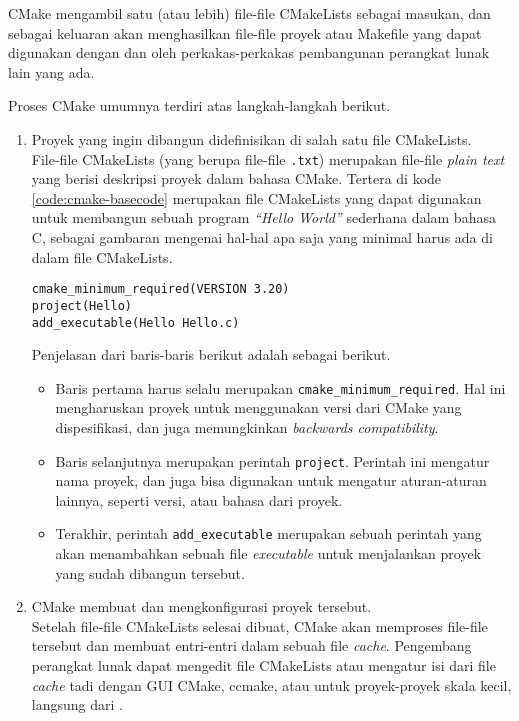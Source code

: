 CMake mengambil satu (atau lebih) file-file CMakeLists sebagai masukan, dan sebagai keluaran akan menghasilkan file-file proyek atau Makefile yang dapat digunakan dengan dan oleh perkakas-perkakas pembangunan perangkat lunak lain yang ada.

Proses CMake umumnya terdiri atas langkah-langkah berikut.

\begin{enumerate}
	\item Proyek yang ingin dibangun didefinisikan di salah satu file CMakeLists.\\
	File-file CMakeLists (yang berupa file-file \verb|.txt|) merupakan file-file \textit{plain text} yang berisi deskripsi proyek dalam bahasa CMake. Tertera di kode \ref{code:cmake-basecode} merupakan file CMakeLists yang dapat digunakan untuk membangun sebuah program \textit{``Hello World''} sederhana dalam bahasa C, sebagai gambaran mengenai hal-hal apa saja yang minimal harus ada di dalam file CMakeLists.
	
	\begin{lstlisting}[caption=Kode utama operasional CMake, label=code:cmake-basecode]
cmake_minimum_required(VERSION 3.20)
project(Hello)
add_executable(Hello Hello.c)
	\end{lstlisting}
	
	Penjelasan dari baris-baris berikut adalah sebagai berikut.
	
	\begin{itemize}
		\item Baris pertama harus selalu merupakan \verb|cmake_minimum_required|. Hal ini mengharuskan proyek untuk menggunakan versi dari CMake yang dispesifikasi, dan juga memungkinkan \textit{backwards compatibility}.
		\item Baris selanjutnya merupakan perintah \verb|project|. Perintah ini mengatur nama proyek, dan juga bisa digunakan untuk mengatur aturan-aturan lainnya, seperti versi, atau bahasa dari proyek.
		\item Terakhir, perintah \verb|add_executable| merupakan sebuah perintah yang akan menambahkan sebuah file \textit{executable} untuk menjalankan proyek yang sudah dibangun tersebut.
	\end{itemize}
	\item CMake membuat dan mengkonfigurasi proyek tersebut.\\
	Setelah file-file CMakeLists selesai dibuat, CMake akan memproses file-file tersebut dan membuat entri-entri dalam sebuah file \textit{cache}. Pengembang perangkat lunak dapat mengedit file CMakeLists atau mengatur isi dari file \textit{cache} tadi dengan GUI CMake, ccmake, atau untuk proyek-proyek skala kecil, langsung dari \cl.
	

\end{enumerate}
